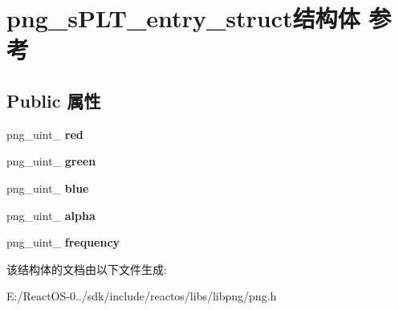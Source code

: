 \hypertarget{structpng__s_p_l_t__entry__struct}{}\section{png\+\_\+s\+P\+L\+T\+\_\+entry\+\_\+struct结构体 参考}
\label{structpng__s_p_l_t__entry__struct}
\subsection*{Public 属性}
\begin{DoxyCompactItemize}
\item 
\mbox{\label{structpng__s_p_l_t__entry__struct_a05ba3cef8aa2c43d1f52c0300c525fd9}} 
png\+\_\+uint\+\_ {\bfseries red}
\item 
\mbox{\label{structpng__s_p_l_t__entry__struct_a3b4269fb63b4087bd618a6741b805554}} 
png\+\_\+uint\+\_ {\bfseries green}
\item 
\mbox{\label{structpng__s_p_l_t__entry__struct_a2af6281d3b400362886a43977ebcb7db}} 
png\+\_\+uint\+\_ {\bfseries blue}
\item 
\mbox{\label{structpng__s_p_l_t__entry__struct_abea98962a064e2a05f460b9f2ea2f47b}} 
png\+\_\+uint\+\_ {\bfseries alpha}
\item 
\mbox{\label{structpng__s_p_l_t__entry__struct_ad8095a15bb5a054c12ef911478c5f3a3}} 
png\+\_\+uint\+\_ {\bfseries frequency}
\end{DoxyCompactItemize}


该结构体的文档由以下文件生成\+:\begin{DoxyCompactItemize}
\item 
E\+:/\+React\+O\+S-\/0../sdk/include/reactos/libs/libpng/png.\+h\end{DoxyCompactItemize}
